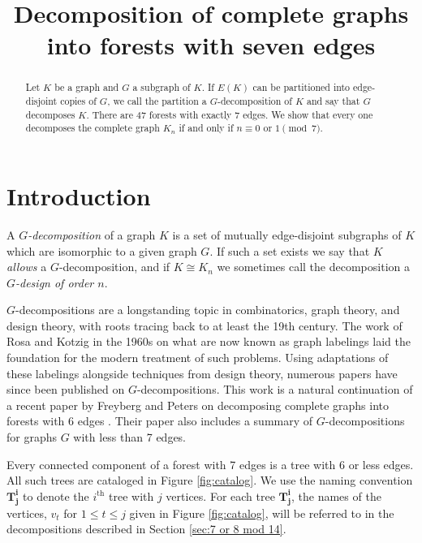 \documentclass{dmgt}
\title{Decomposition of complete graphs into forests with seven edges}
\begin{document}
\begin{abstract}
 Let $K$ be a graph and $G$ a subgraph of $K$. If $E(K)$ can be partitioned into edge-disjoint copies of $G$, we call the partition a $G$-decomposition of $K$ and say that $G$ decomposes $K.$ There are 47 forests with exactly 7 edges. We show that every one decomposes the complete graph $K_{n}$ if and only if $n \equiv 0 \textrm{ or }1\pmod{7}.$
\end{abstract}
\section{Introduction}
A \textit{$G$-decomposition} of a graph $K$ is a set of mutually edge-disjoint subgraphs of $K$ which are isomorphic to a given graph $G$. If such a set exists we say that $K$ \textit{allows} a $G$-decomposition, and if $K\cong K_{n}$ we sometimes call the decomposition a \textit{$G$-design of order $n$}.

$G$-decompositions are a longstanding topic in combinatorics, graph theory, and design theory, with roots tracing back to at least the 19th century. The work of Rosa and Kotzig in the 1960s on what are now known as graph labelings laid the foundation for the modern treatment of such problems. Using adaptations of these labelings alongside techniques from design theory, numerous papers have since been published on $G$-decompositions. This work is a natural continuation of a recent paper by Freyberg and Peters on decomposing complete graphs into forests with 6 edges \cite{bib:Peters}. Their paper also includes a summary of $G$-decompositions for graphs $G$ with less than 7 edges.

Every connected component of a forest with 7 edges is a tree with 6 or less edges. All such trees are cataloged in Figure \ref{fig:catalog}. We use the naming convention $\mathbf{T_{j}^i}$ to denote the $i^{\textrm{th}}$ tree with $j$ vertices. For each tree $\mathbf{T_{j}^i}$, the names of the vertices, $v_t$ for $1 \leq t \leq j$ given in Figure \ref{fig:catalog}, will be referred to in the decompositions described in Section \ref{sec:7 or 8 mod 14}.
\end{document}
